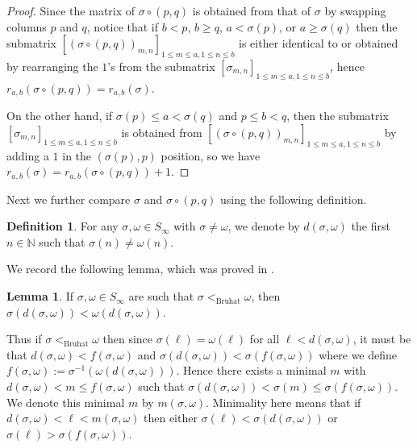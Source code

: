 \documentclass[oneside,11pt,reqno]{amsart}
\newcommand{\nn}{\ensuremath{\mathbb{N}}}
\theoremstyle{definition}
\newtheorem{definition}{Definition}
\newtheorem{proof techniques}{Proof Techniques}
\newtheorem{lemma}{Lemma}
\begin{document}
\begin{proof}
Since the matrix of $\sigma \circ (p , q)$ is obtained from that of $\sigma$ by swapping columns $p$ and $q$, notice that if $b < p$,  $b \geq q$, $a < \sigma(p)$, or $a \geq \sigma(q)$ then the submatrix $[(\sigma \circ (p , q))_{m , n}]_{1 \leq m \leq a , 1 \leq n \leq b}$ is either identical to or obtained by rearranging the $1$'s from the submatrix $[\sigma_{m , n}]_{1 \leq m \leq a , 1 \leq n \leq b}$, hence $r_{a, b}( \sigma \circ (p , q) ) = r_{a, b}(\sigma)$. 

On the other hand, if $\sigma(p) \leq a < \sigma(q)$ and $p \leq b < q$, then the submatrix $[\sigma_{m , n}]_{1 \leq m \leq a , 1 \leq n \leq b}$ is obtained from $[(\sigma \circ (p , q))_{m , n}]_{1 \leq m \leq a , 1 \leq n \leq b}$ by adding a $1$ in the $(\sigma(p) , p)$ position, so we have $r_{a, b}( \sigma ) = r_{a, b}(\sigma \circ (p , q)) + 1$.
\end{proof}

Next we further compare $\sigma$ and $\sigma \circ (p , q)$ using the following definition. 

\begin{definition}\label{def: d}
    For any $\sigma , \omega \in S_\infty$ with $\sigma \neq \omega$, we denote by $d(\sigma , \omega)$ the first $n \in \nn$ such that $\sigma(n) \neq \omega(n)$.
\end{definition}

We record the following lemma, which was proved in \cite[Lemma 25]{gallup2021well}.

\begin{lemma}\label{lem: less than bruhat implies values at d less than}
    If $\sigma , \omega \in S_\infty$ are such that $\sigma <_\text{Bruhat} \omega$, then $\sigma(d(\sigma , \omega)) < \omega(d(\sigma , \omega))$. 
\end{lemma}

Thus if $\sigma <_\text{Bruhat} \omega$ then since $\sigma(\ell) = \omega(\ell)$ for all $\ell < d(\sigma , \omega)$, it must be that $d(\sigma , \omega) < f(\sigma , \omega)$ and $\sigma(d(\sigma, \omega)) < \sigma(f(\sigma , \omega))$ where we define $f(\sigma , \omega) := \sigma^{-1}(\omega(d(\sigma , \omega)))$. Hence there exists a minimal $m$ with $d(\sigma , \omega) < m \leq f(\sigma, \omega)$ such that $\sigma(d( \sigma , \omega)) < \sigma(m) \leq \sigma(f(\sigma , \omega))$. We denote this minimal $m$ by $m(\sigma , \omega)$. Minimality here means that if $d(\sigma , \omega) < \ell < m(\sigma , \omega)$ then either $\sigma(\ell) < \sigma(d(\sigma , \omega))$ or $\sigma(\ell) > \sigma(f(\sigma , \omega))$.
\end{document}
